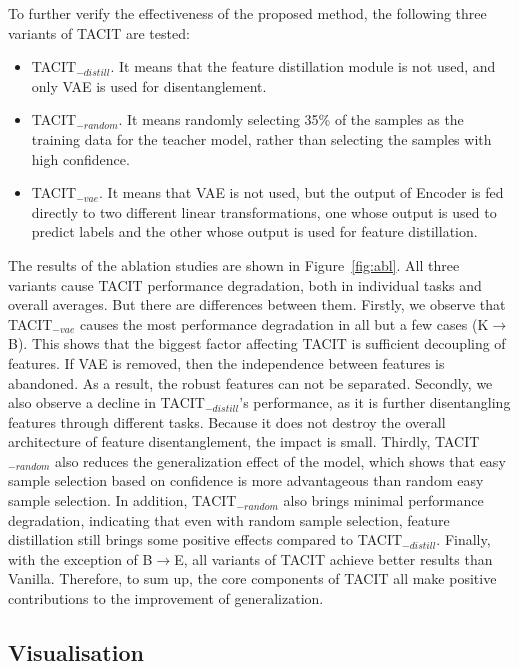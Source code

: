\documentclass[letterpaper]{article} %
\begin{document}
To further verify the effectiveness of the proposed method, the following three variants of TACIT are tested:
\begin{itemize}
	\item TACIT$_{-distill}$. It means that the feature distillation module is not used, and only VAE is used for disentanglement.
	\item TACIT$_{-random}$. It means randomly selecting 35\% of the samples as the training data for the teacher model, rather than selecting the samples with high confidence. 
	\item TACIT$_{-vae}$. It means that VAE is not used, but the output of Encoder is fed directly to two different linear transformations, one whose output is used to predict labels and the other whose output is used for feature distillation. 
\end{itemize}
The results of the ablation studies are shown in Figure~\ref{fig:abl}. All three variants cause TACIT performance degradation, both in individual tasks and overall averages. But there are differences between them. Firstly, we observe that TACIT$_{-vae}$ causes the most performance degradation in all but a few cases (K$\to$B). This shows that the biggest factor affecting TACIT is sufficient decoupling of features. If VAE is removed, then the independence between features is abandoned. As a result, the robust features can not be separated. Secondly, we also observe a decline in TACIT$_{-distill}$'s performance, as it is further disentangling features through different tasks. Because it does not destroy the overall architecture of feature disentanglement, the impact is small. Thirdly, TACIT$_{-random}$ also reduces the generalization effect of the model, which shows that easy sample selection based on confidence is more advantageous than random easy sample selection. In addition, TACIT$_{-random}$ also brings minimal performance degradation, indicating that even with random sample selection, feature distillation still brings some positive effects compared to TACIT$_{-distill}$. Finally, with the exception of B$\to$E, all variants of TACIT achieve better results than Vanilla. Therefore, to sum up, the core components of TACIT all make positive contributions to the improvement of generalization.

\subsection{Visualisation}\label{sec:vis}
\end{document}

